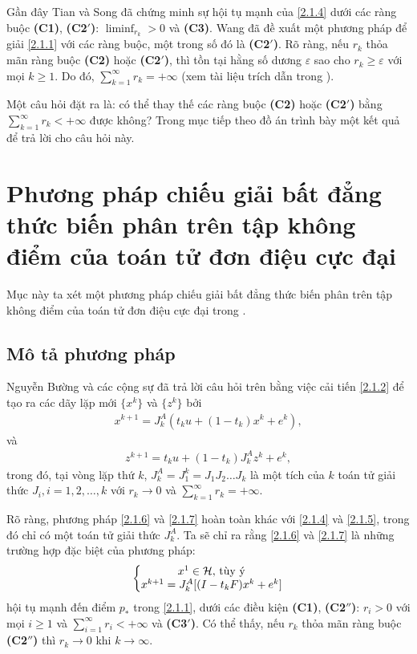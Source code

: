 \documentclass[14pt, oneside,A4paper]{book}
\theoremstyle{plain}
\begin{document}
Gần đây Tian và Song đã chứng minh sự hội tụ mạnh của \eqref{2.1.4} dưới các ràng buộc {\bf (C1)}, {\bf ({C2}$'$)}: $\liminf_{r_{k}}>0$ và {\bf (C3)}. Wang đã đề xuất một phương pháp để giải \eqref{2.1.1} với các ràng buộc, một trong số đó là {\bf ({C2}$'$)}. Rõ ràng, nếu $r_{k}$ thỏa mãn ràng buộc {\bf (C2)} hoặc {\bf ({C2}$'$)}, thì tồn tại hằng số dương $ \varepsilon $ sao cho $r_{k} \geq  \varepsilon $ với mọi $k \geq 1$. Do đó, $\sum_{k=1}^{\infty}r_{k}=+\infty$ (xem tài liệu trích dẫn trong \cite{BHN}). 

Một câu hỏi đặt ra là: có thể thay thế các ràng buộc {\bf (C2)} hoặc {\bf ({C2}$'$)} bằng $\sum_{k=1}^{\infty}r_{k}<+\infty$ được không? Trong mục tiếp theo đồ án trình bày một kết quả để trả lời cho câu hỏi này.

\section{Phương pháp chiếu giải bất đẳng thức biến phân trên tập không điểm của toán tử đơn điệu cực đại}

Mục này ta xét một phương pháp chiếu giải bất đẳng thức biến phân trên tập không điểm của toán tử đơn điệu cực đại trong \cite{BHN}. 

\subsection{Mô tả phương pháp}

Nguyễn Bường và các cộng sự đã trả lời câu hỏi trên bằng việc cải tiến \eqref{2.1.2} để tạo ra các dãy lặp mới $\lbrace x^{k}\rbrace$ và $\lbrace z^{k}\rbrace$ bởi
\begin{align} \label{2.1.6}
x^{k+1}=J^A_{k}(t_{k}u+(1-t_{k})x^{k}+e^{k}),
\end{align}
và
\begin{align} \label{2.1.7}
z^{k+1}=t_{k}u+(1-t_{k})J^A_{k}z^{k}+e^{k},
\end{align}
trong đó, tại vòng lặp thứ $k$, $J^A_{k}=J_{1}^{k}=J_{1}J_{2}\dots J_{k}$ là một tích của $k$ toán tử giải thức $J_{i},i=1,2,\dots,k$ với $r_{k} \rightarrow 0$ và $\sum_{k=1}^{\infty}r_{k}=+\infty$.

Rõ ràng, phương pháp \eqref{2.1.6} và \eqref{2.1.7} hoàn toàn khác với \eqref{2.1.4} và \eqref{2.1.5}, trong đó chỉ có một toán tử giải thức $J^A_{k}$. Ta sẽ chỉ ra rằng \eqref{2.1.6} và \eqref{2.1.7} là những trường hợp đặc biệt của phương pháp:
\begin{align} \label{2.1.8}
\left\{\begin{matrix}
x^{1} \in \mathcal H, $  tùy ý$
\\ 
x^{k+1}=J^A_{k}[(I-t_{k}F)x^{k}+e^{k}]
\end{matrix}\right.
\end{align}
hội tụ mạnh đến điểm $p_{*}$ trong \eqref{2.1.1}, dưới các điều kiện {\bf (C1)}, {\bf ({C2}$''$)}: $r_{i}>0$ với mọi $i \geq 1$ và $\sum_{i=1}^{\infty}r_{i}<+\infty$ và {\bf ({C3}$'$)}. Có thể thấy, nếu $r_{k}$ thỏa mãn ràng buộc {\bf ({C2}$''$)} thì $r_{k} \rightarrow 0$ khi $k \rightarrow \infty$.
\end{document}
